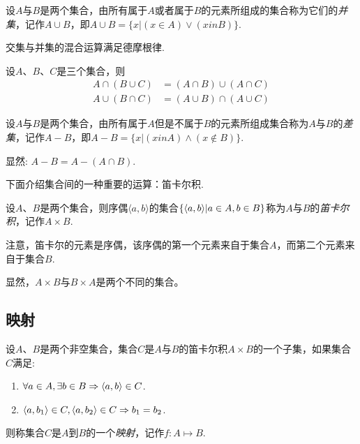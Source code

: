\begin{definition}
  设$A$与$B$是两个集合，由所有属于$A$或者属于$B$的元素所组成的集合称为它们的\emph{并集}，记作$A \cup B$，即$A \cup B = \{x | (x \in A) \lor (x in B) \}$.
\end{definition}

交集与并集的混合运算满足德摩根律.
\begin{theorem}
  设$A$、$B$、$C$是三个集合，则
  \begin{align*}
    A \cap (B \cup C) & = (A \cap B) \cup (A \cap C) \\
    A \cup (B \cap C) & = (A \cup B) \cap (A \cup C) 
  \end{align*}
\end{theorem}

\begin{definition}
  设$A$与$B$是两个集合，由所有属于$A$但是不属于$B$的元素所组成集合称为$A$与$B$的\emph{差集}，记作$A-B$，即$A-B = \{x | (x in A) \land (x \notin B) \}$.
\end{definition}

显然: $A-B = A - (A \cap B)$.

下面介绍集合间的一种重要的运算：笛卡尔积.
\begin{definition}
  设$A$、$B$是两个集合，则序偶$\langle a,b \rangle$的集合$\{ \langle a, b \rangle | a \in A, b \in B \}$称为$A$与$B$的\emph{笛卡尔积}，记作$A \times B$.
\end{definition}

注意，笛卡尔的元素是序偶，该序偶的第一个元素来自于集合$A$，而第二个元素来自于集合$B$.

显然，$A \times B$与$B \times A$是两个不同的集合。

\subsection{映射}
\label{sec:map}

\begin{definition}
  设$A$、$B$是两个非空集合，集合$C$是$A$与$B$的笛卡尔积$A \times B$的一个子集，如果集合$C$满足:
  \begin{enumerate}
  \item $\forall a \in A, \exists  b \in B \Rightarrow \langle a, b \rangle \in C$.
  \item $ \langle a, b_1 \rangle \in C, \langle a, b_2 \rangle \in C \Rightarrow b_1=b_2$.
  \end{enumerate}
  则称集合$C$是$A$到$B$的一个\emph{映射}，记作$f:A \mapsto B$.
\end{definition}

